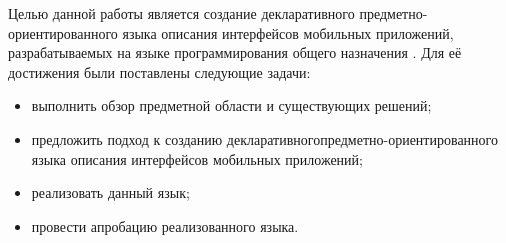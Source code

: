 Целью данной работы является создание декларативного предметно-ориентированного языка описания интерфейсов мобильных приложений, разрабатываемых на языке программирования общего назначения . Для её достижения были поставлены следующие задачи:
\begin{itemize}
	\item выполнить обзор предметной области и существующих решений;
	\item предложить подход к созданию декларативного\newline предметно-ориентированного языка описания интерфейсов мобильных приложений;
	\item реализовать данный язык;
	\item провести апробацию реализованного языка.
\end{itemize}